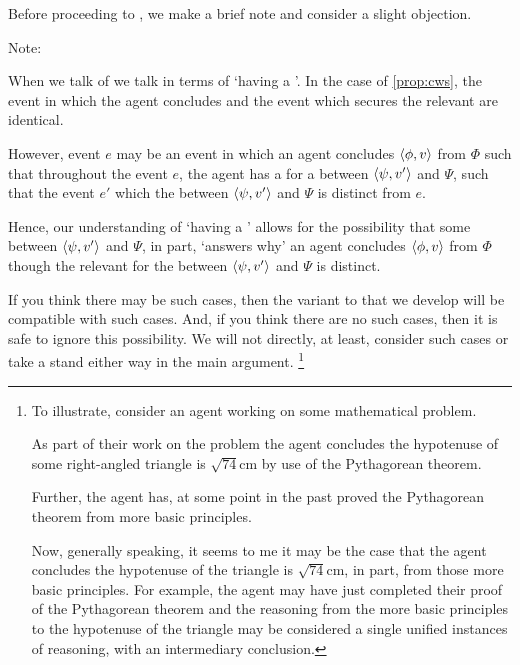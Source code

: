 \begin{note}
  Before proceeding to \supportII{}, we make a brief note and consider a slight objection.
\end{note}

\begin{note}
  Note:

  When we talk of  we talk in terms of `having a '.
  In the case of \autoref{prop:cws}, the event in which the agent concludes and the event which secures the relevant \wit{} are identical.

  However, event \(e\) may be an event in which an agent concludes \(\langle \phi, v \rangle\) from \(\Phi\) such that throughout the event \(e\), the agent has a \wit{} for a \ros{} between \(\langle \psi, v' \rangle\) and \(\Psi\), such that the event \(e'\) which  the \ros{} between \(\langle \psi, v' \rangle\) and \(\Psi\) is distinct from \(e\).

  Hence, our understanding of `having a ' allows for the possibility that some \ros{} between \(\langle \psi, v' \rangle\) and \(\Psi\), in part, `answers why' an agent concludes \(\langle \phi, v \rangle\) from \(\Phi\) though the relevant  for the \ros{} between \(\langle \psi, v' \rangle\) and \(\Psi\) is distinct.

  If you think there may be such cases, then the variant to \issueInclusion{} that we develop will be compatible with such cases.
  And, if you think there are no such cases, then it is safe to ignore this possibility.
  We will not directly, at least, consider such cases or take a stand either way in the main argument.%
  \footnote{
    To illustrate, consider an agent working on some mathematical problem.

    As part of their work on the problem the agent concludes the hypotenuse of some right-angled triangle is \(\sqrt{74}\text{cm}\) by use of the Pythagorean theorem.

    Further, the agent has, at some point in the past proved the Pythagorean theorem from more basic principles.

    Now, generally speaking, it seems to me it may be the case that the agent concludes the hypotenuse of the triangle is \(\sqrt{74}\text{cm}\), in part, from those more basic principles.
    For example, the agent may have just completed their proof of the Pythagorean theorem and the reasoning from the more basic principles to the hypotenuse of the triangle may be considered a single unified instances of reasoning, with an intermediary conclusion.

}
\end{note}
